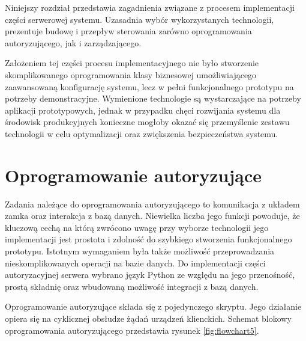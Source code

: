\label{chap:server}

    Niniejszy rozdział przedstawia zagadnienia związane z procesem implementacji części serwerowej systemu. Uzasadnia wybór wykorzystanych technologii, prezentuje budowę i przepływ sterowania zarówno oprogramowania autoryzującego, jak i zarządzającego.

    Założeniem tej części procesu implementacyjnego nie było stworzenie skomplikowanego oprogramowania klasy biznesowej umożliwiającego zaawansowaną konfigurację systemu, lecz w pełni funkcjonalnego prototypu na potrzeby demonstracyjne. Wymienione technologie są wystarczające na potrzeby aplikacji prototypowych, jednak w przypadku chęci rozwijania systemu dla środowisk produkcyjnych konieczne mogłoby okazać się przemyślenie zestawu technologii w celu optymalizacji oraz zwiększenia bezpieczeństwa systemu.

    \section{Oprogramowanie autoryzujące}
    \label{s:auth_subs}

    	Zadania należące do oprogramowania autoryzującego to komunikacja z układem zamka oraz interakcja z bazą danych. Niewielka liczba jego funkcji powoduje, że kluczową cechą na którą zwrócono uwagę przy wyborze technologii jego implementacji jest prostota i zdolność do szybkiego stworzenia funkcjonalnego prototypu. Istotnym wymaganiem była także możliwość przeprowadzania nieskomplikowanych operacji na bazie danych.
    	Do implementacji części autoryzacyjnej serwera wybrano język Python ze względu na jego przenośność, prostą składnię oraz wbudowaną możliwość integracji z bazą danych.

    	Oprogramowanie autoryzujące składa się z pojedynczego skryptu. Jego działanie opiera się na cyklicznej obsłudze żądań urządzeń klienckich. Schemat blokowy oprogramowania autoryzującego przedstawia rysunek \ref{fig:flowchart5}.

